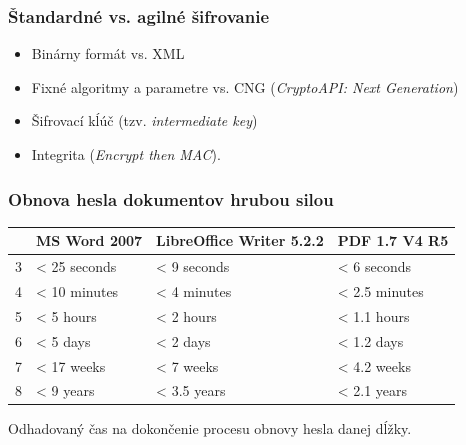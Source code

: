 \documentclass[xcolor=dvipsnames]{beamer}
\begin{document}

\begin{frame}
	\frametitle{Štandardné vs. agilné šifrovanie}
	\begin{itemize}
		\item Binárny formát vs. XML
		\item Fixné algoritmy a parametre vs. CNG (\textit{CryptoAPI: Next Generation})
		\item Šifrovací kĺúč (tzv. \textit{intermediate key})
		\item Integrita (\textit{Encrypt then MAC}). 
	\end{itemize}
\end{frame}


\begin{frame}
	\frametitle{Obnova hesla dokumentov hrubou silou}
	
	 \begin{table}[h]
	\centering
	\begin{tabular}{|l|l|l|l|}
           \hline
		&\textbf{MS Word 2007}&\textbf{LibreOffice Writer 5.2.2}&\textbf{PDF 1.7 V4 R5}\\
	\hline
		3&< 25 seconds&< 9 seconds&< 6 seconds\\
	\hline
		4&< 10 minutes&< 4 minutes&< 2.5 minutes\\
	\hline
		5&< 5 hours& < 2 hours&< 1.1 hours\\
	\hline
		6&< 5 days&< 2 days&< 1.2 days\\
	\hline
		7&< 17 weeks&< 7 weeks&< 4.2 weeks\\
	\hline
		8&< 9 years&< 3.5 years&< 2.1 years\\
	\hline
           \end{tabular}
	\end{table}
\begin{center}	
	\vspace{-5mm}
	\scriptsize{Odhadovaný čas na dokončenie procesu obnovy hesla danej dĺžky.}
\end{center}
\end{frame}

\end{document}
